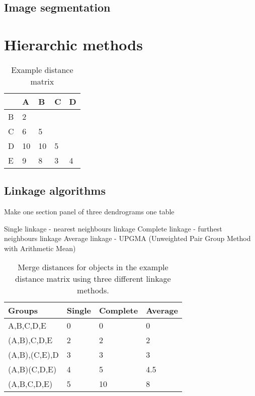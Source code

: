 \documentclass[]{book}
\theoremstyle{definition}
\theoremstyle{definition}
\theoremstyle{definition}
\theoremstyle{remark}
\begin{document}
\subsection{Image segmentation}\label{image-segmentation}

\section{Hierarchic methods}\label{hierarchic-methods}

\begin{table}

\caption{\label{tab:distance-matrix}Example distance matrix}
\centering
\begin{tabular}[t]{lllll}
\toprule
  & A & B & C & D\\
\midrule
B & 2 &  &  & \\
C & 6 & 5 &  & \\
D & 10 & 10 & 5 & \\
E & 9 & 8 & 3 & 4\\
\bottomrule
\end{tabular}
\end{table}

\subsection{Linkage algorithms}\label{linkage-algorithms}

Make one section panel of three dendrograms one table

Single linkage - nearest neighbours linkage Complete linkage - furthest
neighbours linkage Average linkage - UPGMA (Unweighted Pair Group Method
with Arithmetic Mean)

\begin{table}

\caption{\label{tab:distance-merge}Merge distances for objects in the example distance matrix using three different linkage methods.}
\centering
\begin{tabular}[t]{llll}
\toprule
Groups & Single & Complete & Average\\
\midrule
A,B,C,D,E & 0 & 0 & 0\\
(A,B),C,D,E & 2 & 2 & 2\\
(A,B),(C,E),D & 3 & 3 & 3\\
(A,B)(C,D,E) & 4 & 5 & 4.5\\
(A,B,C,D,E) & 5 & 10 & 8\\
\bottomrule
\end{tabular}
\end{table}
\end{document}
